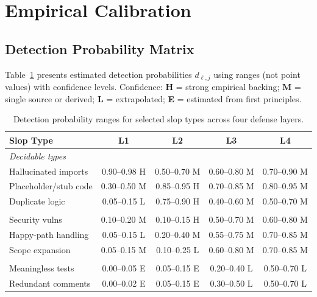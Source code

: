 \documentclass[11pt, a4paper]{article}
\theoremstyle{definition}
\theoremstyle{remark}
\begin{document}
\section{Empirical Calibration}
\label{sec:calibration}

\subsection{Detection Probability Matrix}

Table~\ref{tab:detection} presents estimated detection probabilities $d_{\ell,j}$ using ranges (not point values) with confidence levels. Confidence: \textbf{H} = strong empirical backing; \textbf{M} = single source or derived; \textbf{L} = extrapolated; \textbf{E} = estimated from first principles.

\begin{table}[htbp]
\centering
\caption{Detection probability ranges for selected slop types across four defense layers.}
\label{tab:detection}
\small
\begin{tabular}{@{}l c c c c@{}}
\toprule
\textbf{Slop Type} & \textbf{L1} & \textbf{L2} & \textbf{L3} & \textbf{L4} \\
\midrule
\multicolumn{5}{l}{\textit{Decidable types}} \\
\addlinespace
Hallucinated imports & 0.90--0.98 H & 0.50--0.70 M & 0.60--0.80 M & 0.70--0.90 M \\
Placeholder/stub code & 0.30--0.50 M & 0.85--0.95 H & 0.70--0.85 M & 0.80--0.95 M \\
Duplicate logic & 0.05--0.15 L & 0.75--0.90 H & 0.40--0.60 M & 0.50--0.70 M \\
\addlinespace
\multicolumn{5}{l}{\textit{Semi-decidable types}} \\
\addlinespace
Security vulns & 0.10--0.20 M & 0.10--0.15 H & 0.50--0.70 M & 0.60--0.80 M \\
Happy-path handling & 0.05--0.15 L & 0.20--0.40 M & 0.55--0.75 M & 0.70--0.85 M \\
Scope expansion & 0.05--0.15 M & 0.10--0.25 L & 0.60--0.80 M & 0.70--0.85 M \\
\addlinespace
\multicolumn{5}{l}{\textit{Undecidable types}} \\
\addlinespace
Meaningless tests & 0.00--0.05 E & 0.05--0.15 E & 0.20--0.40 L & 0.50--0.70 L \\
Redundant comments & 0.00--0.02 E & 0.05--0.15 E & 0.30--0.50 L & 0.50--0.70 L \\
\bottomrule
\end{tabular}
\end{table}
\end{document}
